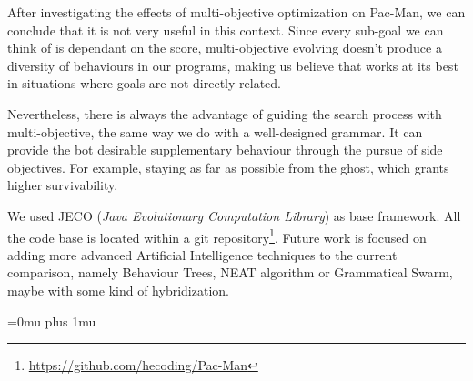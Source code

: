 \documentclass{llncs}
\begin{document}
After investigating the effects of multi-objective optimization on Pac-Man, we can conclude that it is not very useful in this context. Since every sub-goal we can think of is dependant on the score, multi-objective evolving doesn't produce a diversity of behaviours in our programs, making us believe that works at its best in situations where goals are not directly related.

Nevertheless, there is always the advantage of guiding the search process with multi-objective, the same way we do with a well-designed grammar. It can provide the bot desirable supplementary behaviour through the pursue of side objectives. For example, staying as far as possible from the ghost, which grants higher survivability.

We used JECO (\textit{Java Evolutionary Computation Library}) as base framework. All the code base is located within a git repository\footnote{\url{https://github.com/hecoding/Pac-Man}}. Future work is focused on adding more advanced Artificial Intelligence techniques to the current comparison, namely Behaviour Trees, NEAT algorithm or Grammatical Swarm, maybe with some kind of hybridization.


\Urlmuskip=0mu plus 1mu %

%

\end{document}
